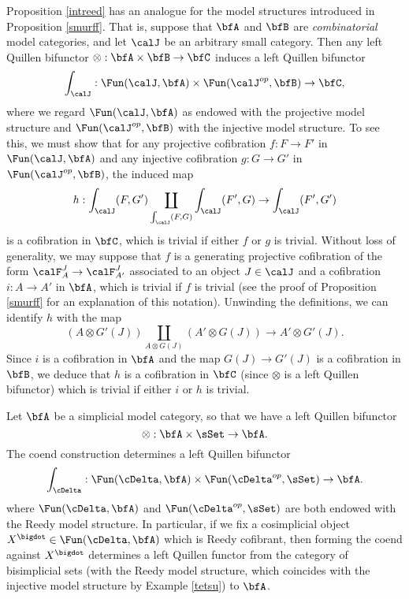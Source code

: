 \begin{remark}\label{cabler}
Proposition \ref{intreed} has an analogue for the model structures introduced in Proposition \ref{smurff}. That is, suppose that $\bfA$ and $\bfB$ are {\em combinatorial} model categories, and let $\calJ$ be an arbitrary small category. Then any left Quillen bifunctor
$\otimes: \bfA \times \bfB \rightarrow \bfC$ induces a left Quillen bifunctor
$$ \int_{ \calJ}: \Fun( \calJ, \bfA) \times \Fun( \calJ^{op}, \bfB) \rightarrow \bfC,$$
where we regard $\Fun(\calJ, \bfA)$ as endowed with the projective model structure
and $\Fun(\calJ^{op}, \bfB)$ with the injective model structure. To see this, we must show that 
for any projective cofibration $f: F \rightarrow F'$ in $\Fun(\calJ, \bfA)$ and any injective cofibration
$g: G \rightarrow G'$ in $\Fun(\calJ^{op}, \bfB)$, the induced map 
$$ h: \int_{\calJ}(F,G') \coprod_{ \int_{\calJ}(F,G) } \int_{\calJ}(F',G) \rightarrow \int_{\calJ}(F',G')$$
is a cofibration in $\bfC$, which is trivial if either $f$ or $g$ is trivial. Without loss of generality,
we may suppose that $f$ is a generating projective cofibration of the form
$\calF^{J}_{A} \rightarrow \calF^{J}_{A'}$ associated to an object $J \in \calJ$ and a
cofibration $i: A \rightarrow A'$ in $\bfA$, which is trivial if $f$ is trivial (see
the proof of Proposition \ref{smurff} for an explanation of this notation). Unwinding the definitions, we can identify $h$ with the map
$$ (A \otimes G'(J)) \coprod_{ A \otimes G(J) } (A' \otimes G(J)) \rightarrow
A' \otimes G'(J).$$
Since $i$ is a cofibration in $\bfA$ and the map $G(J) \rightarrow G'(J)$
is a cofibration in $\bfB$, we deduce that $h$ is a cofibration
in $\bfC$ (since $\otimes$ is a left Quillen bifunctor) which is trivial if either
$i$ or $h$ is trivial.
\end{remark}

\begin{example}\label{cabletome}
Let $\bfA$ be a simplicial model category, so that we have a left Quillen bifunctor
$$ \otimes: \bfA \times \sSet \rightarrow \bfA.$$
The coend construction determines a left Quillen bifunctor
$$ \int_{\cDelta}: \Fun( \cDelta, \bfA) \times \Fun( \cDelta^{op}, \sSet) \rightarrow \bfA.$$
where $\Fun(\cDelta, \bfA)$ and $\Fun( \cDelta^{op}, \sSet)$ are both endowed with the Reedy model structure. In particular, if we fix a cosimplicial object
$X^{\bigdot} \in \Fun(\cDelta, \bfA)$ which is Reedy cofibrant, then forming the coend
against $X^{\bigdot}$ determines a left Quillen functor from the category
of bisimplicial sets (with the Reedy model structure, which coincides with the
injective model structure by Example \ref{tetsu}) to $\bfA$.
\end{example}


